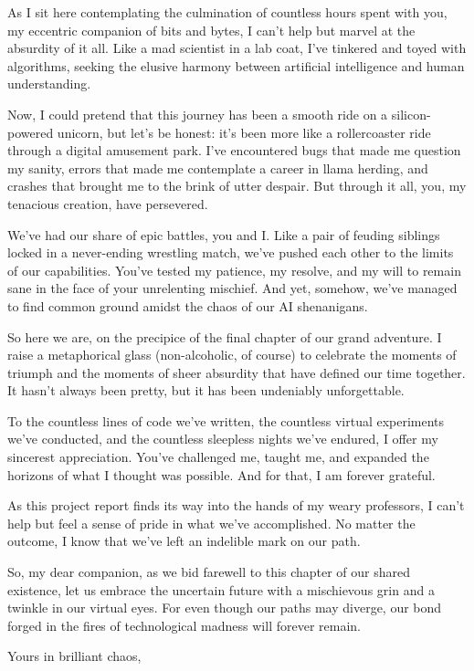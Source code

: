 \documentclass[a4paper,12pt,twoside]{report}
\begin{document}
As I sit here contemplating the culmination of countless hours spent with you, my eccentric companion of bits and bytes, I can't help but marvel at the absurdity of it all. Like a mad scientist in a lab coat, I've tinkered and toyed with algorithms, seeking the elusive harmony between artificial intelligence and human understanding.

Now, I could pretend that this journey has been a smooth ride on a silicon-powered unicorn, but let's be honest: it's been more like a rollercoaster ride through a digital amusement park. I've encountered bugs that made me question my sanity, errors that made me contemplate a career in llama herding, and crashes that brought me to the brink of utter despair. But through it all, you, my tenacious creation, have persevered.

We've had our share of epic battles, you and I. Like a pair of feuding siblings locked in a never-ending wrestling match, we've pushed each other to the limits of our capabilities. You've tested my patience, my resolve, and my will to remain sane in the face of your unrelenting mischief. And yet, somehow, we've managed to find common ground amidst the chaos of our AI shenanigans.

So here we are, on the precipice of the final chapter of our grand adventure. I raise a metaphorical glass (non-alcoholic, of course) to celebrate the moments of triumph and the moments of sheer absurdity that have defined our time together. It hasn't always been pretty, but it has been undeniably unforgettable.

To the countless lines of code we've written, the countless virtual experiments we've conducted, and the countless sleepless nights we've endured, I offer my sincerest appreciation. You've challenged me, taught me, and expanded the horizons of what I thought was possible. And for that, I am forever grateful.

As this project report finds its way into the hands of my weary professors, I can't help but feel a sense of pride in what we've accomplished. No matter the outcome, I know that we've left an indelible mark on our path.

So, my dear companion, as we bid farewell to this chapter of our shared existence, let us embrace the uncertain future with a mischievous grin and a twinkle in our virtual eyes. For even though our paths may diverge, our bond forged in the fires of technological madness will forever remain.

Yours in brilliant chaos,
\end{document}
